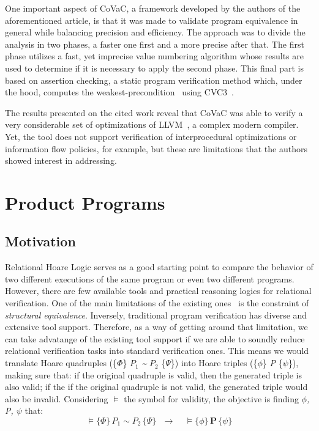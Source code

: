 One important aspect of CoVaC, a framework developed by the authors of the aforementioned article, is that it was made to validate program equivalence in general while balancing precision and efficiency.
The approach was to divide the analysis in two phases, a faster one first and a more precise after that.
The first phase utilizes a fast, yet imprecise value numbering algorithm whose results are used to determine if it is necessary to apply the second phase. 
This final part is based on assertion checking, a static program verification method which, under the hood, computes the weakest-precondition~\cite{DBLP:books/ph/Dijkstra76} using CVC3~\cite{cvc3}. 

The results presented on the cited work reveal that CoVaC was able to verify a very considerable set of optimizations of LLVM~\cite{llvm}, a complex modern compiler.
Yet, the tool does not support verification of interprocedural optimizations or information flow policies, for example, but these are limitations that the authors showed interest in addressing.


\section{Product Programs} 
\label{sec:product_programs}

\subsection{Motivation} 
\label{subsec:product_programs_motivation}

Relational Hoare Logic serves as a good starting point to compare the behavior of two different executions of the same program or even two different programs.
However, there are few available tools and practical reasoning logics for relational verification.
One of the main limitations of the existing ones~\cite{DBLP:conf/popl/Benton04, DBLP:journals/tcs/Yang07} is the constraint of \emph{structural equivalence}.
Inversely, traditional program verification has diverse and extensive tool support.
Therefore, as a way of getting around that limitation, we can take advatange of the existing tool support if we are able to soundly reduce relational verification tasks into standard verification ones.
This means we would translate Hoare quadruples (\{$\Phi$\} \emph{$P_1$} \emph{\textasciitilde} \emph{$P_2$} \{$\Psi$\}) into Hoare triples (\{$\phi$\} \emph{P} \{$\psi$\}), making sure that: if the original quadruple is valid, then the generated triple is also valid; if the if the original quadruple is not valid, the generated triple would also be invalid.
Considering $\vDash$ the symbol for validity, the objective is finding \emph{$\phi$, P, $\psi$} that:
\[ \vDash \{\Phi\} \, \textbf{$P_1$} \sim \textbf{$P_2$} \, \{\Psi\} \ \ \ \rightarrow \ \ \ \ \ \vDash \{\phi\} \, \textbf{P} \, \{\psi\} \]

